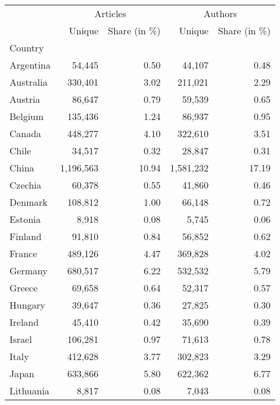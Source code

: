 \begin{tabular}{lrrrr}
\toprule
{} & \multicolumn{2}{c}{Articles} & \multicolumn{2}{c}{Authors} \\
{} &    Unique & Share (in \%) &    Unique & Share (in \%) \\
Country        &           &              &           &              \\
\midrule
Argentina      &    54,445 &         0.50 &    44,107 &         0.48 \\
Australia      &   330,401 &         3.02 &   211,021 &         2.29 \\
Austria        &    86,647 &         0.79 &    59,539 &         0.65 \\
Belgium        &   135,436 &         1.24 &    86,937 &         0.95 \\
Canada         &   448,277 &         4.10 &   322,610 &         3.51 \\
Chile          &    34,517 &         0.32 &    28,847 &         0.31 \\
China          & 1,196,563 &        10.94 & 1,581,232 &        17.19 \\
Czechia        &    60,378 &         0.55 &    41,860 &         0.46 \\
Denmark        &   108,812 &         1.00 &    66,148 &         0.72 \\
Estonia        &     8,918 &         0.08 &     5,745 &         0.06 \\
Finland        &    91,810 &         0.84 &    56,852 &         0.62 \\
France         &   489,126 &         4.47 &   369,828 &         4.02 \\
Germany        &   680,517 &         6.22 &   532,532 &         5.79 \\
Greece         &    69,658 &         0.64 &    52,317 &         0.57 \\
Hungary        &    39,647 &         0.36 &    27,825 &         0.30 \\
Ireland        &    45,410 &         0.42 &    35,690 &         0.39 \\
Israel         &   106,281 &         0.97 &    71,613 &         0.78 \\
Italy          &   412,628 &         3.77 &   302,823 &         3.29 \\
Japan          &   633,866 &         5.80 &   622,362 &         6.77 \\
Lithuania      &     8,817 &         0.08 &     7,043 &         0.08 \\

\end{tabular}
